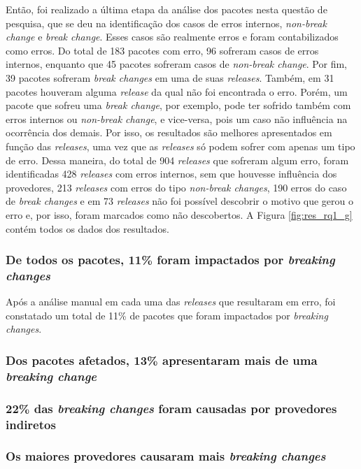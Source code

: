 Então, foi realizado a última etapa da análise dos pacotes nesta questão de pesquisa, que se deu na identificação dos casos de erros internos, \textit{non-break change} e \textit{break change}. Esses casos são realmente erros e foram contabilizados como erros. Do total de 183 pacotes com erro, 96 sofreram casos de erros internos, enquanto que 45 pacotes sofreram casos de \textit{non-break change}. Por fim, 39 pacotes sofreram \textit{break changes} em uma de suas \textit{releases}. Também, em 31 pacotes houveram alguma \textit{release} da qual não foi encontrada o erro. Porém, um pacote que sofreu uma \textit{break change}, por exemplo, pode ter sofrido também com erros internos ou \textit{non-break change}, e vice-versa, pois um caso não influência na ocorrência dos demais. Por isso, os resultados são melhores apresentados em função das \textit{releases}, uma vez que as \textit{releases} só podem sofrer com apenas um tipo de erro. Dessa maneira, do total de 904 \textit{releases} que sofreram algum erro, foram identificadas 428 \textit{releases} com erros internos, sem que houvesse influência dos provedores, 213 \textit{releases} com erros do tipo \textit{non-break changes}, 190 erros do caso de \textit{break changes} e em 73 \textit{releases} não foi possível descobrir o motivo que gerou o erro e, por isso, foram marcados como não descobertos. A Figura \ref{fig:res_rq1_g} contém todos os dados dos resultados.



\subsubsection{De todos os pacotes, 11\% foram impactados por \textit{breaking changes}}
Após a análise manual em cada uma das \textit{releases} que resultaram em erro, foi constatado um total de 11\% de pacotes que foram impactados por \textit{breaking changes}.

\subsubsection{Dos pacotes afetados, 13\% apresentaram mais de uma \textit{breaking change}}

\subsubsection{22\% das \textit{breaking changes} foram causadas por provedores indiretos}

\subsubsection{Os maiores provedores causaram mais \textit{breaking changes}}

